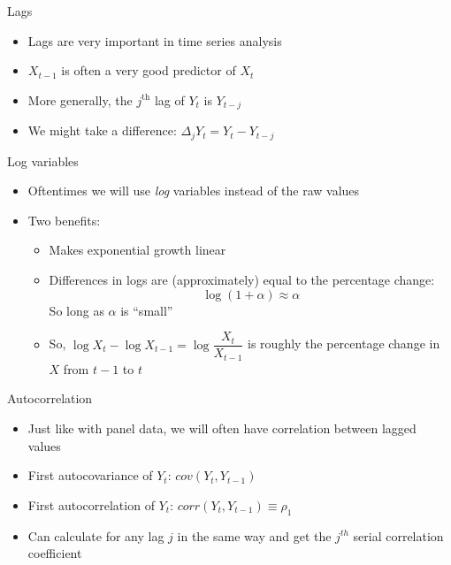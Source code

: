 \documentclass[aspectratio=169]{beamer}
\begin{document}
\begin{frame}{Lags}
    \begin{itemize}
        \item Lags are very important in time series analysis
        \item $X_{t-1}$ is often a very good predictor of $X_{t}$
        \item More generally, the $j^{\text{th}}$ lag of $Y_t$ is $Y_{t-j}$
        \item We might take a difference: $\Delta_j Y_t = Y_{t} - Y_{t-j}$
    \end{itemize}
\end{frame}

\begin{frame}{Log variables}
    \begin{itemize}
       \item Oftentimes we will use \textit{log} variables instead of the raw values
       \item Two benefits:
       \begin{itemize}
        \item Makes exponential growth linear
        \item Differences in logs are (approximately) equal to the percentage change:
        $$
        \log(1 + \alpha) \approx \alpha
        $$
        So long as $\alpha$ is ``small''
        \item So, $\log X_{t} - \log X_{t-1} = \log \dfrac{X_{t}}{X_{t-1}}$ is roughly the percentage change in $X$ from $t-1$ to $t$
       \end{itemize}
    \end{itemize}
\end{frame}

\begin{frame}{Autocorrelation}
    \begin{itemize}
       \item Just like with panel data, we will often have correlation between lagged values
       \item First autocovariance of $Y_t$: $cov(Y_t,Y_{t-1})$
       \item First autocorrelation of $Y_t$: $corr(Y_t,Y_{t-1}) \equiv \rho_1$
       \item Can calculate for any lag $j$ in the same way and get the $j^{th}$ serial correlation coefficient
    \end{itemize}
\end{frame}
\end{document}
